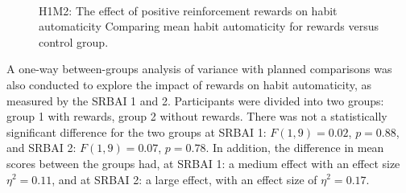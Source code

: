 \begin{figure}[H]
  \centering
  \caption{H1M2: The effect of positive reinforcement rewards on habit automaticity Comparing mean habit automaticity for rewards versus control group.}~\label{fig:m2_h1}
\end{figure}


A one-way between-groups analysis of variance with planned comparisons was also conducted to explore the impact of rewards on habit automaticity, as measured by the SRBAI 1 and 2. Participants were divided into two groups: group 1 with rewards, group 2 without rewards. There was not a
statistically significant difference for the two groups at SRBAI 1: $F(1,9) = 0.02$, $p = 0.88$, and SRBAI 2: $F(1,9) = 0.07$, $p = 0.78$. In addition, the difference in mean scores between the groups had, at SRBAI 1: a medium effect with an effect size $\eta^{2} = 0.11$, and at SRBAI 2: a large effect, with an effect size of $\eta^{2} = 0.17$.

